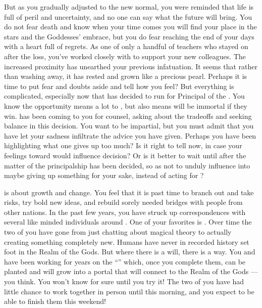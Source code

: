 \documentclass[char]{GL2020}
\begin{document}
But as you gradually adjusted to the new normal, you were reminded that life is full of peril and uncertainty, and no one can say what the future will bring. You do not fear death and know when your time comes you will find your place in the stars and the Goddesses’ embrace, but you do fear reaching the end of your days with a heart full of regrets. As one of only a handful of teachers who stayed on after the loss, you’ve worked closely with \cMusic{} to support your new colleagues. The increased proximity has unearthed your previous infatuation. It seems that rather than washing away, it has rested and grown like a precious pearl. Perhaps it is time to put fear and doubts aside and tell \cMusic{\them} how you feel? But everything is complicated, especially now that \cMusic{} has decided to run for Principal of the \pSchool{}. You know the opportunity means a lot to \cMusic{\them}, but also means \cMusic{\they} will be immortal if they win. \cMusic{} has been coming to you for counsel, asking about the tradeoffs and seeking balance in this decision. You want to be impartial, but you must admit that you have let your sadness infiltrate the advice you have given. Perhaps you have been highlighting what one gives up too much? Is it right to tell \cMusic{} now, in case your feelings toward \cMusic{\them} would influence \cMusic{\their} decision? Or is it better to wait until after the matter of the principalship has been decided, so as not to unduly influence \cMusic{\them} into maybe giving up something for your sake, instead of acting for \cMusic{\themself}?

\cFlow{} is about growth and change. You feel that it is past time to branch out and take risks, try bold new ideas, and rebuild sorely needed bridges with people from other nations. In the past few years, you have struck up correspondences with several like minded individuals around \pEarth{}. One of your favorites is \cCurse{\full}. Over time the two of you have gone from just chatting about magical theory to actually creating something completely new. Humans have never in recorded history set foot in the Realm of the Gods. But where there is a will, there is a way. You and \cCurse{} have been working for years on the ``\iBeansMB{}'' which, once you complete them, can be planted and will grow into a portal that will connect \pEarth{} to the Realm of the Gods — you think. You won't know for sure until you try it! The two of you have had little chance to work together in person until this morning, and you expect to be able to finish them this weekend! 
\end{document}

